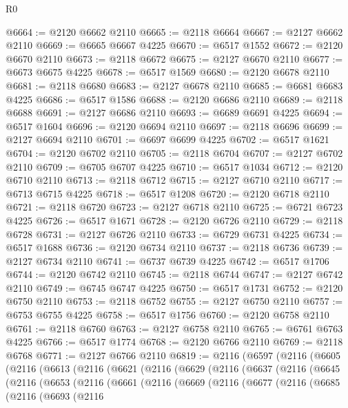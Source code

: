 \begin{lexlean}{R0}
\begin{coremodule}
@6664 := @2120 @6662 @2110
@6665 := @2118 @6664
@6667 := @2127 @6662 @2110
@6669 := @6665 @6667 @4225
@6670 := @6517 @1552
@6672 := @2120 @6670 @2110
@6673 := @2118 @6672
@6675 := @2127 @6670 @2110
@6677 := @6673 @6675 @4225
@6678 := @6517 @1569
@6680 := @2120 @6678 @2110
@6681 := @2118 @6680
@6683 := @2127 @6678 @2110
@6685 := @6681 @6683 @4225
@6686 := @6517 @1586
@6688 := @2120 @6686 @2110
@6689 := @2118 @6688
@6691 := @2127 @6686 @2110
@6693 := @6689 @6691 @4225
@6694 := @6517 @1604
@6696 := @2120 @6694 @2110
@6697 := @2118 @6696
@6699 := @2127 @6694 @2110
@6701 := @6697 @6699 @4225
@6702 := @6517 @1621
@6704 := @2120 @6702 @2110
@6705 := @2118 @6704
@6707 := @2127 @6702 @2110
@6709 := @6705 @6707 @4225
@6710 := @6517 @1034
@6712 := @2120 @6710 @2110
@6713 := @2118 @6712
@6715 := @2127 @6710 @2110
@6717 := @6713 @6715 @4225
@6718 := @6517 @1208
@6720 := @2120 @6718 @2110
@6721 := @2118 @6720
@6723 := @2127 @6718 @2110
@6725 := @6721 @6723 @4225
@6726 := @6517 @1671
@6728 := @2120 @6726 @2110
@6729 := @2118 @6728
@6731 := @2127 @6726 @2110
@6733 := @6729 @6731 @4225
@6734 := @6517 @1688
@6736 := @2120 @6734 @2110
@6737 := @2118 @6736
@6739 := @2127 @6734 @2110
@6741 := @6737 @6739 @4225
@6742 := @6517 @1706
@6744 := @2120 @6742 @2110
@6745 := @2118 @6744
@6747 := @2127 @6742 @2110
@6749 := @6745 @6747 @4225
@6750 := @6517 @1731
@6752 := @2120 @6750 @2110
@6753 := @2118 @6752
@6755 := @2127 @6750 @2110
@6757 := @6753 @6755 @4225
@6758 := @6517 @1756
@6760 := @2120 @6758 @2110
@6761 := @2118 @6760
@6763 := @2127 @6758 @2110
@6765 := @6761 @6763 @4225
@6766 := @6517 @1774
@6768 := @2120 @6766 @2110
@6769 := @2118 @6768
@6771 := @2127 @6766 @2110
@6819 := @2116
    (@6597
      (@2116
        (@6605
          (@2116
            (@6613
              (@2116
                (@6621
                  (@2116
                    (@6629
                      (@2116
                        (@6637
                          (@2116
                            (@6645
                              (@2116
                                (@6653
                                  (@2116
                                    (@6661
                                      (@2116
                                        (@6669
                                          (@2116
                                            (@6677
                                              (@2116
                                                (@6685
                                                  (@2116
                                                    (@6693
                                                      (@2116

\end{coremodule}
\end{lexlean}
